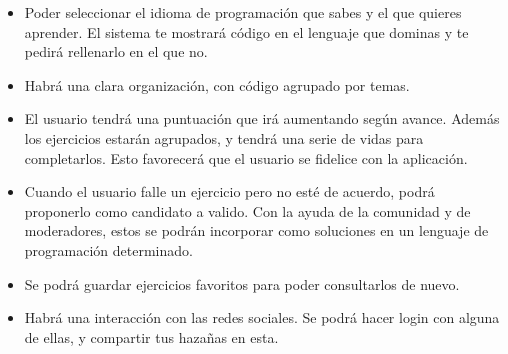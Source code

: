 \begin{itemize}
\item
Poder seleccionar el idioma de programación que sabes y el que quieres aprender. El sistema te mostrará código en el lenguaje que dominas y te pedirá rellenarlo en el que no.

\item
Habrá una clara organización, con código agrupado por temas.

\item
El usuario tendrá una puntuación que irá aumentando según avance. Además los ejercicios estarán agrupados, y tendrá una serie de vidas para completarlos. Esto favorecerá  que el usuario se fidelice con la aplicación.

\item
Cuando el usuario falle un ejercicio pero no esté de acuerdo, podrá proponerlo como candidato a valido. Con la ayuda de la comunidad y de moderadores, estos se podrán incorporar como soluciones en un lenguaje de programación determinado.

\item
Se podrá guardar ejercicios favoritos para poder consultarlos de nuevo.

\item
Habrá una interacción con las redes sociales. Se podrá hacer login con alguna de ellas, y compartir tus hazañas en esta.
\end{itemize}